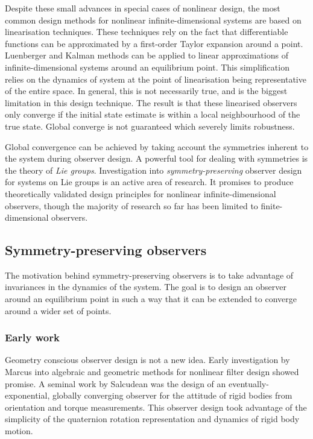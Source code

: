 Despite these small advances in special cases of nonlinear design, the most common design methods for nonlinear infinite-dimensional systems are based on linearisation techniques. These techniques rely on the fact that differentiable functions can be approximated by a first-order Taylor expansion around a point. Luenberger and Kalman methods can be applied to linear approximations of infinite-dimensional systems around an equilibrium point. This simplification relies on the dynamics of system at the point of linearisation being representative of the entire space. In general, this is not necessarily true, and is the biggest limitation in this design technique. The result is that these linearised observers only converge if the initial state estimate is within a local neighbourhood of the true state. Global converge is not guaranteed which severely limits robustness.

Global convergence can be achieved by taking account the symmetries inherent to the system during observer design. A powerful tool for dealing with symmetries is the theory of \textit{Lie groups}. Investigation into \textit{symmetry-preserving} observer design for systems on Lie groups is an active area of research. It promises to produce theoretically validated design principles for nonlinear infinite-dimensional observers, though the majority of research so far has been limited to finite-dimensional observers.

\subsection{Symmetry-preserving observers}
The motivation behind symmetry-preserving observers is to take advantage of invariances in the dynamics of the system. The goal is to design an observer around an equilibrium point in such a way that it can be extended to converge around a wider set of points.

\subsubsection{Early work}
Geometry conscious observer design is not a new idea. Early investigation by Marcus \cite{marcus1984algebraic} into algebraic and geometric methods for nonlinear filter design showed promise.
A seminal work by Salcudean \cite{salcudean1991globally} was the design of an eventually-exponential, globally converging observer for the attitude of rigid bodies from orientation and torque measurements. This observer design took advantage of the simplicity of the quaternion rotation representation and dynamics of rigid body motion.

